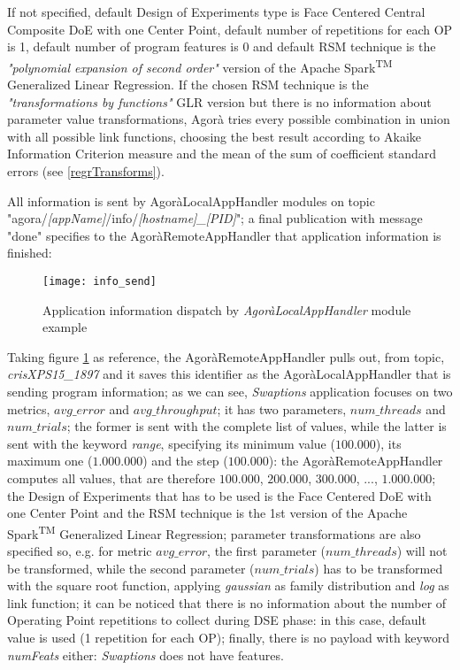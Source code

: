 If not specified, default Design of Experiments type is Face Centered Central Composite DoE with one Center Point, default number of repetitions for each OP is 1, default number of program features is 0 and default RSM technique is the \textit{"polynomial expansion of second order"} version of the Apache Spark\textsuperscript{TM} Generalized Linear Regression. If the chosen RSM technique is the \textit{"transformations by functions"} GLR version but there is no information about parameter value transformations, Agorà tries every possible combination in union with all possible link functions, choosing the best result according to Akaike Information Criterion measure and the mean of the sum of coefficient standard errors (see \ref{regrTransforms}).

All information is sent by AgoràLocalAppHandler modules on topic "agora\slash{}\textit{[appName]}\slash{}info\slash{}\textit{[hostname]\_[PID]}"; a final publication with message "done" specifies to the AgoràRemoteAppHandler that application information is finished:

\begin{figure}[H]

    \centering
    \texttt{[image: info\_send]}
    \caption{Application information dispatch by \textit{AgoràLocalAppHandler} module example}
    \label{fig:info_send}
    
\end{figure}

Taking figure \ref{fig:info_send} as reference, the AgoràRemoteAppHandler pulls out, from topic, \textit{crisXPS15\_1897} and it saves this identifier as the AgoràLocalAppHandler that is sending program information; as we can see, \textit{Swaptions} application focuses on two metrics, $avg\_error$ and $avg\_throughput$; it has two parameters, $num\_threads$ and $num\_trials$; the former is sent with the complete list of values, while the latter is sent with the keyword \textit{range}, specifying its minimum value ($100.000$), its maximum one ($1.000.000$) and the step ($100.000$): the Agorà\-Remote\-App\-Handler computes all values, that are therefore $100.000$, $200.000$, $300.000$, ..., $1.000.000$; the Design of Experiments that has to be used is the Face Centered DoE with one Center Point and the RSM technique is the 1st version of the Apache Spark\textsuperscript{TM} Generalized Linear Regression; parameter transformations are also specified so, e.g. for metric $avg\_error$, the first parameter ($num\_threads$) will not be transformed, while the second parameter ($num\_trials$) has to be transformed with the square root function, applying \textit{gaussian} as family distribution and \textit{log} as link function; it can be noticed that there is no information about the number of Operating Point repetitions to collect during DSE phase: in this case, default value is used (1 repetition for each OP); finally, there is no payload with keyword \textit{numFeats} either: \textit{Swaptions} does not have features.


